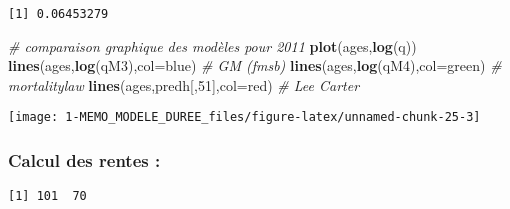 \documentclass[
]{article}
\newenvironment{Shaded}{\begin{snugshade}}{\end{snugshade}}
\newcommand{\AttributeTok}[1]{\textcolor[rgb]{0.13,0.29,0.53}{#1}}
\newcommand{\CommentTok}[1]{\textcolor[rgb]{0.56,0.35,0.01}{\textit{#1}}}
\newcommand{\DecValTok}[1]{\textcolor[rgb]{0.00,0.00,0.81}{#1}}
\newcommand{\DocumentationTok}[1]{\textcolor[rgb]{0.56,0.35,0.01}{\textbf{\textit{#1}}}}
\newcommand{\FunctionTok}[1]{\textcolor[rgb]{0.13,0.29,0.53}{\textbf{#1}}}
\newcommand{\NormalTok}[1]{#1}
\newcommand{\OtherTok}[1]{\textcolor[rgb]{0.56,0.35,0.01}{#1}}
\newcommand{\SpecialCharTok}[1]{\textcolor[rgb]{0.81,0.36,0.00}{\textbf{#1}}}
\newcommand{\StringTok}[1]{\textcolor[rgb]{0.31,0.60,0.02}{#1}}
\begin{document}
\begin{verbatim}
[1] 0.06453279
\end{verbatim}

\begin{Shaded}
\begin{Highlighting}[]
\CommentTok{\# comparaison graphique des modèles pour 2011}
\FunctionTok{plot}\NormalTok{(ages,}\FunctionTok{log}\NormalTok{(q))}
\FunctionTok{lines}\NormalTok{(ages,}\FunctionTok{log}\NormalTok{(qM3),}\AttributeTok{col=}\StringTok{\textquotesingle{}blue\textquotesingle{}}\NormalTok{) }\CommentTok{\# GM (fmsb)}
\FunctionTok{lines}\NormalTok{(ages,}\FunctionTok{log}\NormalTok{(qM4),}\AttributeTok{col=}\StringTok{\textquotesingle{}green\textquotesingle{}}\NormalTok{) }\CommentTok{\# mortalitylaw}
\FunctionTok{lines}\NormalTok{(ages,predh[,}\DecValTok{51}\NormalTok{],}\AttributeTok{col=}\StringTok{\textquotesingle{}red\textquotesingle{}}\NormalTok{) }\CommentTok{\# Lee Carter}
\end{Highlighting}
\end{Shaded}

\begin{center}\texttt{[image: 1-MEMO\_MODELE\_DUREE\_files/figure-latex/unnamed-chunk-25-3]} \end{center}

\hypertarget{calcul-des-rentes}{%
\subsubsection{Calcul des rentes :}\label{calcul-des-rentes}}

\begin{Shaded}
\end{Shaded}

\begin{verbatim}
[1] 101  70
\end{verbatim}
\end{document}
